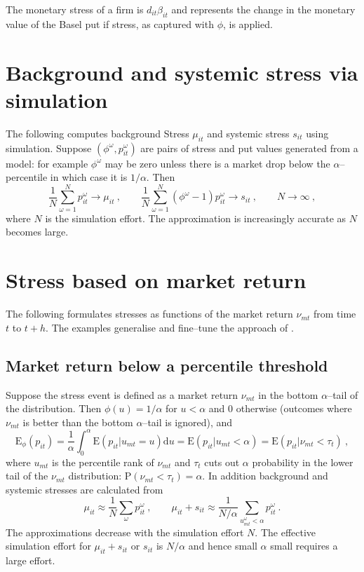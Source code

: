 \documentclass[12pt]{article}
\newcommand{\E}{\mathrm{E}}
\newcommand{\p}{\mathrm{P}}
\renewcommand{\o}{\omega}
\newcommand{\Es}{\E_\phi}
\newcommand{\de}{\mathrm{d}}
\newcommand{\cq}{\ , \qquad}
\newcommand{\be}[1]{\begin{equation}\label{#1}}
\newcommand{\ee}{\end{equation}}
\begin{document}
The  monetary stress of a firm is
$
d_{it}\beta_{it}
$
and represents the change in the monetary value of the Basel put  if stress, as captured with $\phi$, is applied.

\section{Background and systemic stress via simulation}\label{estimate}

The following computes background Stress $\mu_{it}$ and systemic stress $s_{it}$ using simulation.   Suppose $(\phi^\o,p_{it}^\o)$ are pairs of stress and put values generated from a model: for example $\phi^\o$ may be zero unless there is a market drop below the $\alpha$--percentile in which case it is $1/\alpha$.
Then
\be{simulate}
\frac{1}{N}\sum_{\o=1}^N p_{it}^\o\rightarrow \mu_{it}\cq \frac{1}{N}\sum_{\o=1}^N (\phi^\o-1)p_{it}^\o\rightarrow s_{it} \cq N\rightarrow\infty\ ,
\ee
where $N$ is the simulation effort.  The approximation is increasingly accurate as $N$ becomes large.





\section{Stress based on  market return}\label{marketstress}


The following formulates stresses as functions of the market return $\nu_{mt}$ from time $t$ to $t+h$. The examples generalise and fine--tune the approach of \cite{brownlees2015}.

\subsection{Market return below a percentile threshold}

Suppose the stress event is defined as a market return $\nu_{mt}$ in the bottom $\alpha$--tail of the distribution.   Then  $\phi(u)=1/\alpha$ for $u< \alpha$ and 0 otherwise (outcomes where $\nu_{mt}$ is better than the bottom $\alpha$--tail is ignored), and
$$
\Es(p_{it}) = \frac{1}{\alpha}\int_0^\alpha\E(p_{it}|u_{mt}=u)\de u = \E(p_{it}|u_{mt}<\alpha) = \E(p_{it}|\nu_{mt}<\tau_{t}) \ ,
$$
where $u_{mt}$ is the percentile rank of $\nu_{mt}$ and $\tau_t$ cuts out $\alpha$ probability in the lower tail of the $\nu_{mt}$ distribution: $\p(\nu_{mt}<\tau_t)=\alpha$. In addition background and systemic stresses are calculated from
$$
\mu_{it}\approx \frac{1}{N} \sum_\o p_{it}^\o \cq  \mu_{it}+s_{it}   \approx  \frac{1}{N/\alpha} \sum_{u^\o_{mt}<\alpha}  p_{it}^\o\ .
$$
The approximations decrease with the simulation effort $N$.   The effective simulation effort for $\mu_{it}+s_{it}$ or $s_{it}$ is $N/\alpha$ and hence small $\alpha$ small requires a large effort.
\end{document}
